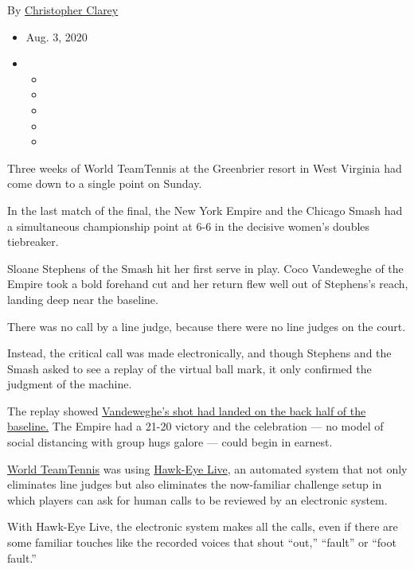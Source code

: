 By \href{https://www.nytimes.com/by/christopher-clarey}{Christopher
Clarey}

\begin{itemize}
\item
  Aug. 3, 2020
\item
  \begin{itemize}
  \item
  \item
  \item
  \item
  \item
  \end{itemize}
\end{itemize}

Three weeks of World TeamTennis at the Greenbrier resort in West
Virginia had come down to a single point on Sunday.

In the last match of the final, the New York Empire and the Chicago
Smash had a simultaneous championship point at 6-6 in the decisive
women's doubles tiebreaker.

Sloane Stephens of the Smash hit her first serve in play. Coco
Vandeweghe of the Empire took a bold forehand cut and her return flew
well out of Stephens's reach, landing deep near the baseline.

There was no call by a line judge, because there were no line judges on
the court.

Instead, the critical call was made electronically, and though Stephens
and the Smash asked to see a replay of the virtual ball mark, it only
confirmed the judgment of the machine.

The replay showed
\href{https://twitter.com/WorldTeamTennis/status/1290004012100714497}{Vandeweghe's
shot had landed on the back half of the baseline.} The Empire had a
21-20 victory and the celebration --- no model of social distancing with
group hugs galore --- could begin in earnest.

\href{https://www.nytimes.com/2020/07/11/sports/tennis/Bryan-brothers.html}{World
TeamTennis} was using
\href{https://www.nytimes.com/2018/03/01/sports/tennis/hawkeye-live-line-calling.html?searchResultPosition=1}{Hawk-Eye
Live}, an automated system that not only eliminates line judges but also
eliminates the now-familiar challenge setup in which players can ask for
human calls to be reviewed by an electronic system.

With Hawk-Eye Live, the electronic system makes all the calls, even if
there are some familiar touches like the recorded voices that shout
``out,'' ``fault'' or ``foot fault.''

